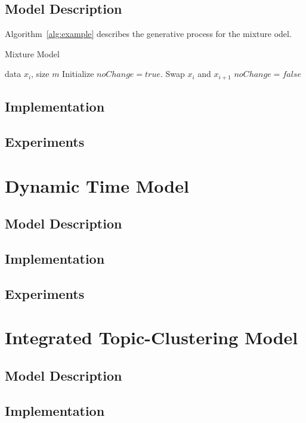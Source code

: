 \documentclass{article}
\begin{document}
\subsection{Model Description} 
    Algorithm~\ref{alg:example} describes the generative process for the mixture odel.

    \begin{algorithm}[tb]
       \caption{Mixture Model}
       \label{alg:example}
    \begin{algorithmic}
        data $x_i$, size $m$
       \REPEAT
       \STATE Initialize $noChange = true$.
       \STATE Swap $x_i$ and $x_{i+1}$
       \STATE $noChange = false$
       \ENDIF
       \ENDFOR
    \end{algorithmic}
    \end{algorithm}
\subsection{Implementation} 
\subsection{Experiments}  


\section{Dynamic Time Model} 
\label{dtmsec}
\subsection{Model Description} 
\subsection{Implementation} 
\subsection{Experiments} 


\section{Integrated Topic-Clustering Model} 
\label{intsec}
\subsection{Model Description} 
\subsection{Implementation} 
\end{document}
